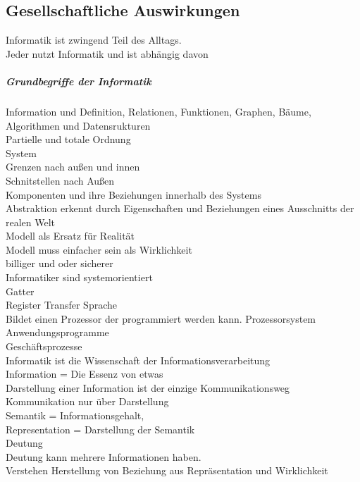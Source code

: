 \documentclass{article}
\begin{document}
	\subsection*{Gesellschaftliche Auswirkungen}
	Informatik ist zwingend Teil des Alltags. \\
	Jeder nutzt Informatik und ist abhängig davon \\
	\subparagraph*{Grundbegriffe der Informatik}
	Information und Definition, Relationen, Funktionen, Graphen, Bäume, Algorithmen und Datensrukturen \\
	Partielle und totale Ordnung \\
	System \\
	Grenzen nach außen und innen \\
	Schnitstellen nach Außen \\
	Komponenten und ihre Beziehungen innerhalb des Systems \\
	Abstraktion erkennt durch Eigenschaften und Beziehungen eines Ausschnitts der realen Welt \\
	Modell als Ersatz für Realität \\
	Modell muss einfacher sein als Wirklichkeit \\
	billiger und oder sicherer \\
	Informatiker sind systemorientiert \\
	Gatter \\
	Register Transfer Sprache \\
	Bildet einen Prozessor der programmiert werden kann.
	Prozessorsystem \\
	Anwendungsprogramme \\
	Geschäftsprozesse \\
	Informatik ist die Wissenschaft der Informationsverarbeitung \\
	Information = Die Essenz von etwas \\
	Darstellung einer Information ist der einzige Kommunikationsweg \\
	Kommunikation nur über Darstellung \\
	Semantik = Informationsgehalt, \\
	Representation = Darstellung der Semantik \\
	Deutung \\
	Deutung kann mehrere Informationen haben. \\
	Verstehen Herstellung von Beziehung aus Repräsentation und Wirklichkeit \\
	
\end{document}
